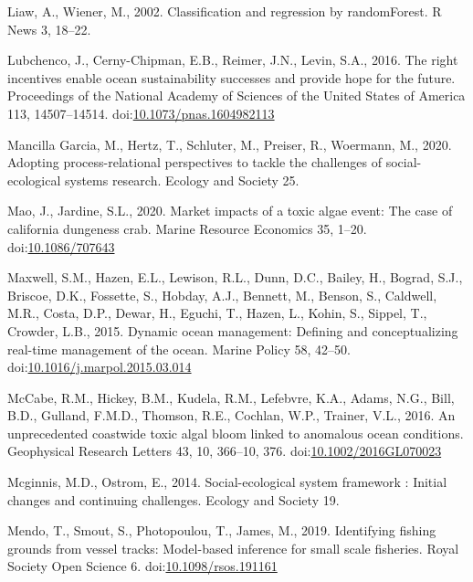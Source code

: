 \documentclass[]{elsarticle} %
\begin{document}
\leavevmode\hypertarget{ref-Wiener2003}{}%
Liaw, A., Wiener, M., 2002. Classification and regression by
randomForest. R News 3, 18--22.

\leavevmode\hypertarget{ref-Lubchenco2016}{}%
Lubchenco, J., Cerny-Chipman, E.B., Reimer, J.N., Levin, S.A., 2016. The
right incentives enable ocean sustainability successes and provide hope
for the future. Proceedings of the National Academy of Sciences of the
United States of America 113, 14507--14514.
doi:\href{https://doi.org/10.1073/pnas.1604982113}{10.1073/pnas.1604982113}

\leavevmode\hypertarget{ref-Mancilla2020}{}%
Mancilla Garcia, M., Hertz, T., Schluter, M., Preiser, R., Woermann, M.,
2020. Adopting process-relational perspectives to tackle the challenges
of social-ecological systems research. Ecology and Society 25.

\leavevmode\hypertarget{ref-Mao2020}{}%
Mao, J., Jardine, S.L., 2020. Market impacts of a toxic algae event: The
case of california dungeness crab. Marine Resource Economics 35, 1--20.
doi:\href{https://doi.org/10.1086/707643}{10.1086/707643}

\leavevmode\hypertarget{ref-Maxwell2015}{}%
Maxwell, S.M., Hazen, E.L., Lewison, R.L., Dunn, D.C., Bailey, H.,
Bograd, S.J., Briscoe, D.K., Fossette, S., Hobday, A.J., Bennett, M.,
Benson, S., Caldwell, M.R., Costa, D.P., Dewar, H., Eguchi, T., Hazen,
L., Kohin, S., Sippel, T., Crowder, L.B., 2015. Dynamic ocean
management: Defining and conceptualizing real-time management of the
ocean. Marine Policy 58, 42--50.
doi:\href{https://doi.org/10.1016/j.marpol.2015.03.014}{10.1016/j.marpol.2015.03.014}

\leavevmode\hypertarget{ref-McCabe2016}{}%
McCabe, R.M., Hickey, B.M., Kudela, R.M., Lefebvre, K.A., Adams, N.G.,
Bill, B.D., Gulland, F.M.D., Thomson, R.E., Cochlan, W.P., Trainer,
V.L., 2016. An unprecedented coastwide toxic algal bloom linked to
anomalous ocean conditions. Geophysical Research Letters 43, 10,
366--10, 376.
doi:\href{https://doi.org/10.1002/2016GL070023}{10.1002/2016GL070023}

\leavevmode\hypertarget{ref-Mcginnis2014}{}%
Mcginnis, M.D., Ostrom, E., 2014. Social-ecological system framework :
Initial changes and continuing challenges. Ecology and Society 19.

\leavevmode\hypertarget{ref-Mendo2019}{}%
Mendo, T., Smout, S., Photopoulou, T., James, M., 2019. Identifying
fishing grounds from vessel tracks: Model-based inference for small
scale fisheries. Royal Society Open Science 6.
doi:\href{https://doi.org/10.1098/rsos.191161}{10.1098/rsos.191161}
\end{document}
